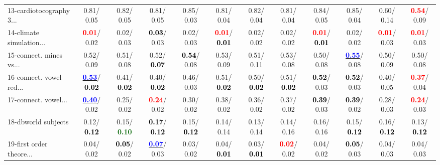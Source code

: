 \begin{table}[h]
\begin{center}
{\begin{tabular}{lc|c|c|c|c|c|c|c|c|c|c}
13-cardiotocography 3... &   0.81/  0.05 &   0.82/  0.05 &   0.81/  0.05 &   0.85/  0.03 &   0.81/  0.04 &   0.82/  0.04 &   0.81/  0.04 &   0.84/  0.05 &   0.85/  0.04 &   0.60/  0.14 & \textcolor{red}{\textbf{  0.54}}/  0.09 \\
14-climate simulation... & \textcolor{red}{\textbf{  0.01}}/  0.02 &   0.02/  0.03 & \textcolor{black}{\textbf{  0.03}}/  0.03 &   0.02/  0.03 & \textcolor{red}{\textbf{  0.01}}/\textcolor{black}{\textbf{  0.01}} &   0.02/  0.02 &   0.02/  0.02 & \textcolor{red}{\textbf{  0.01}}/\textcolor{black}{\textbf{  0.01}} &   0.02/  0.02 & \textcolor{red}{\textbf{  0.01}}/  0.03 & \textcolor{red}{\textbf{  0.01}}/  0.03 \\ \hline
15-connect. mines vs... &   0.52/  0.09 &   0.51/  0.08 &   0.52/\textcolor{black}{\textbf{  0.07}} & \textcolor{black}{\textbf{  0.54}}/  0.08 &   0.53/  0.09 &   0.51/  0.11 &   0.53/  0.08 &   0.50/  0.08 & \underline{\textcolor{blue}{\textbf{  0.55}}}/  0.08 &   0.50/  0.09 &   0.50/  0.08 \\
16-connect. vowel red... & \underline{\textcolor{blue}{\textbf{  0.53}}}/\textcolor{black}{\textbf{  0.02}} &   0.41/\textcolor{black}{\textbf{  0.02}} &   0.40/\textcolor{black}{\textbf{  0.02}} &   0.46/  0.03 &   0.51/\textcolor{black}{\textbf{  0.02}} &   0.50/\textcolor{black}{\textbf{  0.02}} &   0.51/\textcolor{black}{\textbf{  0.02}} & \textcolor{black}{\textbf{  0.52}}/  0.03 & \textcolor{black}{\textbf{  0.52}}/  0.03 &   0.40/  0.05 & \textcolor{red}{\textbf{  0.37}}/  0.04 \\
17-connect. vowel... & \underline{\textcolor{blue}{\textbf{  0.40}}}/  0.02 &   0.25/  0.02 & \textcolor{red}{\textbf{  0.24}}/  0.02 &   0.30/  0.02 &   0.38/  0.02 &   0.36/  0.02 &   0.37/  0.02 & \textcolor{black}{\textbf{  0.39}}/  0.03 & \textcolor{black}{\textbf{  0.39}}/  0.02 &   0.28/  0.03 & \textcolor{red}{\textbf{  0.24}}/  0.03 \\
18-dbworld subjects &   0.12/\textcolor{black}{\textbf{  0.12}} &   0.15/\textcolor{darkgreen}{\textbf{  0.10}} & \textcolor{black}{\textbf{  0.17}}/\textcolor{black}{\textbf{  0.12}} &   0.15/\textcolor{black}{\textbf{  0.12}} &   0.14/  0.14 &   0.13/  0.14 &   0.14/  0.16 &   0.16/  0.16 &   0.15/\textcolor{black}{\textbf{  0.12}} &   0.16/\textcolor{black}{\textbf{  0.12}} &   0.13/\textcolor{black}{\textbf{  0.12}} \\
19-first order theore... &   0.04/  0.02 & \textcolor{black}{\textbf{  0.05}}/  0.02 & \underline{\textcolor{blue}{\textbf{  0.07}}}/  0.03 &   0.03/  0.02 &   0.04/\textcolor{black}{\textbf{  0.01}} &   0.03/\textcolor{black}{\textbf{  0.01}} & \textcolor{red}{\textbf{  0.02}}/  0.02 &   0.04/  0.02 & \textcolor{black}{\textbf{  0.05}}/  0.03 &   0.04/  0.03 &   0.04/  0.03 \\

\end{tabular}}
\end{center}
\end{table}
